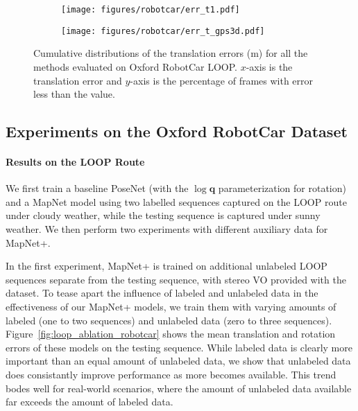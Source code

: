  
\begin{figure}
    \centering
    \begin{subfigure}{0.48\linewidth}
        \centering
        \texttt{[image: figures/robotcar/err\_t1.pdf]}
    \end{subfigure}
    \hfill
    \begin{subfigure}{0.48\linewidth}
        \centering
        \texttt{[image: figures/robotcar/err\_t\_gps3d.pdf]}
    \end{subfigure}
    \vspace{-1em} 
    \caption{\small Cumulative distributions of the translation errors (m) for all the methods 
    evaluated on Oxford RobotCar LOOP. $x$-axis is the translation error and $y$-axis is the percentage of frames with error less than
    the value.} 
    \label{fig:res_err_robotcar}
\end{figure}


\subsection{Experiments on the Oxford RobotCar Dataset}

\paragraph{Results on the LOOP Route}
We first train a baseline PoseNet (with the $\log\mathbf{q}$ parameterization for rotation) and a MapNet model using 
two labelled sequences captured on the LOOP route under cloudy weather,
while the testing sequence is captured under sunny weather. We then perform two experiments with different auxiliary data for MapNet+.

In the first experiment, MapNet+ is trained on additional unlabeled LOOP sequences separate from the testing sequence,
with stereo VO provided with the dataset. To tease apart the influence of labeled and unlabeled data in the effectiveness of our MapNet+ models,
we train them with varying amounts of labeled (one to two sequences)
and unlabeled data (zero to three sequences). Figure~\ref{fig:loop_ablation_robotcar} shows the mean
translation and rotation errors of these models on the testing sequence.
While labeled data is clearly more important than an equal amount of unlabeled data,
we show that unlabeled data does consistantly improve performance as more becomes available. This trend bodes well
for real-world scenarios, where the amount of unlabeled data available far exceeds the amount of labeled data.

